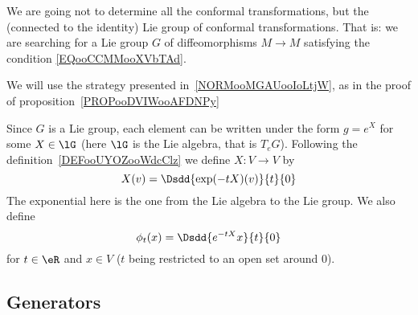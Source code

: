 \begin{remark}
	We are going not to determine all the conformal transformations, but the (connected to the identity) Lie group of conformal transformations. That is: we are searching for a Lie group \( G\) of diffeomorphisms \( M\to M\) satisfying the condition \eqref{EQooCCMMooXVbTAd}.
\end{remark}

We will use the strategy presented in~\ref{NORMooMGAUooIoLtjW}, as in the proof of proposition~\ref{PROPooDVIWooAFDNPy}

Since \( G\) is a Lie group, each element can be written under the form \( g= e^{X}\) for some \( X\in\lG\) (here \( \lG\) is the Lie algebra, that is \( T_eG\)). Following the definition~\ref{DEFooUYOZooWdcClz} we define \( X\colon V\to V\) by
\begin{equation}
	X(v)=\Dsdd{  \exp(-tX)(v) }{t}{0}
\end{equation}
The exponential here is the one from the Lie algebra to the Lie group. We also define
\begin{equation}
	\phi_t(x)=\Dsdd{  e^{-tX}x }{t}{0}
\end{equation}
for \( t\in \eR\) and \( x\in V\) (\( t\) being restricted to an open set around \( 0\)).

\subsection{Generators}

